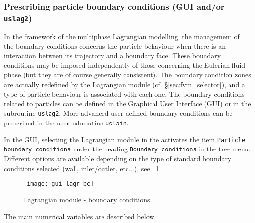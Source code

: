 {{%
\subsubsection{Prescribing particle boundary conditions (GUI and/or \texttt{uslag2})}
In the framework of the multiphase Lagrangian modelling, the management of the boundary conditions concerns the particle behaviour when there is an interaction between its trajectory and a boundary face. These boundary conditions may be imposed independently of those concerning the Eulerian fluid phase (but they are of course generally consistent). The boundary condition zones are actually redefined by the Lagrangian module (cf. \S\ref{sec:fvm_selector}), and a type of particle behaviour is associated with each one. The boundary conditions related to particles can be defined in the Graphical User Interface (GUI) or in the subroutine \texttt{uslag2}. More advanced user-defined boundary conditions can be prescribed in the user-subroutine \texttt{uslain}.


 In the GUI, selecting the Lagrangian module in the activates the item \texttt{Particle boundary conditions} under the heading \texttt{Boundary conditions} in the tree menu. Different options are available depending on the type of standard boundary conditions selected (wall, inlet/outlet, etc...), 
 see \figurename~\ref{fig:CL-Lag}.

\begin{figure}[ht]
\begin{center}
\texttt{[image: gui\_lagr\_bc]}
\caption{Lagrangian module - boundary conditions}
\label{fig:CL-Lag}
\end{center}
\end{figure}


The main numerical variables are described below.


}}
